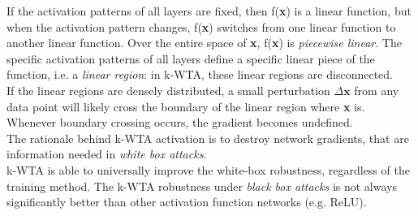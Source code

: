 \documentclass[a4paper]{article}
\begin{document}
If the activation patterns of all layers are fixed, then f(\textbf{x}) is a linear function, but when the activation pattern changes, f(\textbf{x}) switches from one linear function to another linear function. Over the entire space of \textbf{x}, f(\textbf{x}) is \emph{piecewise linear}. The specific activation patterns of all layers define a specific linear piece of the function, i.e. a \emph{linear region}: in k-WTA, these linear regions are disconnected.\\
If the linear regions are densely distributed, a small perturbation $\Delta\textbf{x}$ from any data point will likely cross the boundary of the linear region where \textbf{x} is. Whenever boundary crossing occurs, the gradient becomes undefined.\\
The rationale behind k-WTA activation is to destroy network gradients, that are information needed in \emph{white box attacks}.\\
k-WTA is able to universally improve the white-box robustness, regardless of the training method. The k-WTA robustness under \emph{black box attacks} is not always significantly better than other activation function networks (e.g. ReLU).
 

	
\end{document}

